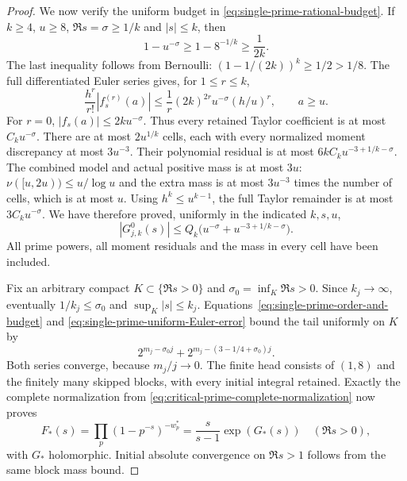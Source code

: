 \documentclass[11pt]{article}
\theoremstyle{definition}
\begin{document}
\begin{proof}
We now verify the uniform budget in
\eqref{eq:single-prime-rational-budget}.
If $k\ge4$, $u\ge8$, $\Re s=\sigma\ge1/k$ and $|s|\le k$,
then
\[
 1-u^{-\sigma}\ge1-8^{-1/k}\ge\frac1{2k}.
\]
The last inequality follows from Bernoulli:
$(1-1/(2k))^k\ge1/2>1/8$.
The full differentiated Euler series gives, for
$1\le r\le k$,
\[
 \frac{h^r}{r!}|f_s^{(r)}(a)|
 \le\frac1r(2k)^{2r}u^{-\sigma}(h/u)^r,
 \qquad a\ge u.
\]
For $r=0$, $|f_s(a)|\le2k u^{-\sigma}$.
Thus every retained Taylor coefficient is at most
$C_k u^{-\sigma}$.
There are at most $2u^{1/k}$ cells, each with every normalized
moment discrepancy at most $3u^{-3}$.
Their polynomial residual is at most
$6kC_k u^{-3+1/k-\sigma}$.
The combined model and actual positive mass is at most $3u$:
$\nu([u,2u))\le u/\log u$ and the extra mass is at most
$3u^{-3}$ times the number of cells, which is at most $u$.
Using $h^k\le u^{k-1}$, the full Taylor remainder is at most
$3C_k u^{-\sigma}$.
We have therefore proved, uniformly in the indicated $k,s,u$,
\begin{equation}
 |G_{j,k}^0(s)|
       \le Q_k\bigl(u^{-\sigma}
                         +u^{-3+1/k-\sigma}\bigr).
 \label{eq:single-prime-uniform-Euler-error}
\end{equation}
All prime powers, all moment residuals and the mass in
every cell have been included.

Fix an arbitrary compact $K\subset\{\Re s>0\}$ and
$\sigma_0=\inf_K\Re s>0$. Since $k_j\to\infty$,
eventually $1/k_j\le\sigma_0$ and $\sup_K|s|\le k_j$.
Equations~\eqref{eq:single-prime-order-and-budget} and
\eqref{eq:single-prime-uniform-Euler-error} bound the
tail uniformly on $K$ by
\[
 2^{m_j-\sigma_0 j}
       +2^{m_j-(3-1/4+\sigma_0)j}.
\]
Both series converge, because $m_j/j\to0$.
The finite head consists of $(1,8)$ and the finitely many
skipped blocks, with every initial integral retained.
Exactly the complete normalization from
\eqref{eq:critical-prime-complete-normalization} now proves
\begin{equation}
 F_*(s)=\prod_p(1-p^{-s})^{-w_p^*}
       =\frac{s}{s-1}\exp(G_*(s))\quad(\Re s>0),
 \label{eq:single-prime-favorable-model}
\end{equation}
with $G_*$ holomorphic. Initial absolute convergence on
$\Re s>1$ follows from the same block mass bound.


\end{proof}
\end{document}
